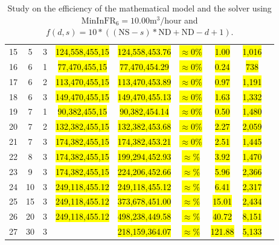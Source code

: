 \documentclass{singlecol}
\theoremstyle{TH}{
\newtheorem{lemma}{Lemma}
\newtheorem{theorem}[lemma]{Theorem}
\newtheorem{corrolary}[lemma]{Corrolary}
\newtheorem{conjecture}[lemma]{Conjecture}
\newtheorem{proposition}[lemma]{Proposition}
\newtheorem{claim}[lemma]{Claim}
\newtheorem{stheorem}[lemma]{Wrong Theorem}
\newtheorem{algorithm}{Algorithm}
}
\theoremstyle{THrm}{
\newtheorem{definition}{Definition}[section]
\newtheorem{question}{Question}[section]
\newtheorem{remark}{Remark}
\newtheorem{scheme}{Scheme}
}
\theoremstyle{THhit}{
\newtheorem{case}{Case}[section]
}
\begin{document}
\begin{table}[h!]
\begin{center}
\begin{small}
\begin{tabular}{ c c c c c c c c c }
	 15  &  5 & 3  & \hl{124,558,455,15} & \hl{124,558,453.76} & \hl{$\approx 0\%$} &  \hl{1.00}   &   \hl{1,016}       \\
	 16  &  6 & 1  & \hl{77,470,455,15} & \hl{77,470,454.29}  & \hl{$\approx 0\%$}  &  \hl{0.24}   &   \hl{738}       \\
	 17  &  6 & 2  & \hl{113,470,455,15} & \hl{113,470,453.89}  & \hl{$\approx 0\%$} &  \hl{0.97}   &   \hl{1,191}      \\
	 18  &  6 & 3  & \hl{149,470,455,15} & \hl{149,470,455.13}  & \hl{$\approx 0\%$} & \hl{1.63}   &   \hl{1,332}     \\
	 19  &  7 & 1  & \hl{90,382,455,15}  & \hl{90,382,454.14}  & \hl{$\approx 0\%$} &  \hl{0.50}   &  \hl{1,480}       \\
	 20  &  7 & 2  & \hl{132,382,455,15} & \hl{132,382,453.68}  & \hl{$\approx 0\%$}  &  \hl{2.27}   &  \hl{2,059}      \\
	 21  &  7 & 3  & \hl{174,382,455,15} & \hl{174,382,453.21}  & \hl{$\approx 0\%$}  &  \hl{2.51}   &  \hl{1,445}      \\
         22  &  8 & 3  & \hl{174,382,455,15} & \hl{199,294,452.93}  & \hl{$\approx \%$}  &  \hl{3.92}   &  \hl{1,470}      \\
	 23  &  9 & 3  & \hl{174,382,455,15} & \hl{224,206,452.66}  & \hl{$\approx \%$}  &  \hl{5.96}   &  \hl{2,366}      \\
	 24  & 10 & 3  & \hl{249,118,455.12} & \hl{249,118,455.12}  & \hl{$\approx \%$}  &  \hl{6.41}   &  \hl{2,317}      \\
	 25  & 15 & 3  & \hl{249,118,455.12} & \hl{373,678,451.00}  & \hl{$\approx \%$}  &  \hl{15.01}   &  \hl{2,434}      \\
         26  & 20 & 3  & \hl{249,118,455.12} & \hl{498,238,449.58}  & \hl{$\approx \%$}  &  \hl{40.72}   &  \hl{8,151}      \\
	 27  & 30 & 3  & \hl{} & \hl{218,159,364.07}  & \hl{$\approx \%$}  &  \hl{121.88}   &  \hl{5,133}      \\
	
	\end{tabular}
\caption{Study on the efficiency of the mathematical model and the solver using $\mathrm{MinInFR}_6 = 10.00 \mathrm{ m^3/hour}$ and $f(d,s) = 10*((\mathrm{NS}-s)*\mathrm{ND} + \mathrm{ND} - d + 1)$.}
\label{tab:lingoEvaluationInflowRest}
\end{small}
\end{center}
\end{table}
\end{document}
